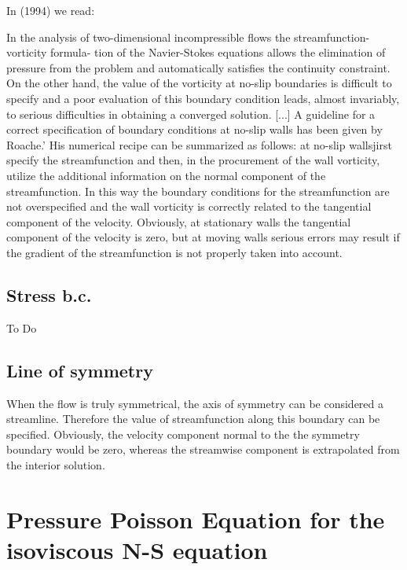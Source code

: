 \noindent In \textcite{comn94} (1994) we read:
\begin{displayquote}
{\color{darkgray}
In the analysis of two-dimensional incompressible flows the streamfunction-vorticity formula-
tion of the Navier-Stokes equations allows the elimination of pressure from the problem and
automatically satisfies the continuity constraint. On the other hand, the value of the vorticity
at no-slip boundaries is difficult to specify and a poor evaluation of this boundary condition
leads, almost invariably, to serious difficulties in obtaining a converged solution.
[...] A guideline for a correct specification of boundary conditions at no-slip walls has been given
by Roache.' His numerical recipe can be summarized as follows: at no-slip wallsjirst specify the
streamfunction and then, in the procurement of the wall vorticity, utilize the additional information
on the normal component of the streamfunction. In this way the boundary conditions for the
streamfunction are not overspecified and the wall vorticity is correctly related to the tangential
component of the velocity. Obviously, at stationary walls the tangential component of the
velocity is zero, but at moving walls serious errors may result if the gradient of the streamfunction
is not properly taken into account.
}
\end{displayquote}



\subsection{Stress b.c.}

{\color{orange} To Do}

\subsection{Line of symmetry}

When the flow is truly symmetrical, the axis of symmetry can be considered a streamline. Therefore the
value of streamfunction along this boundary can be specified. Obviously, the velocity component normal
to the the symmetry boundary would be zero, whereas the streamwise component is extrapolated from
the interior solution.



\section{Pressure Poisson Equation for the isoviscous N-S equation}

